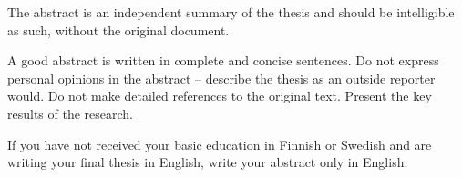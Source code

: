 The abstract is an independent summary of the thesis and should be intelligible as such, without the original document.

A good abstract is written in complete and concise sentences. Do not express personal opinions in the abstract – describe the thesis as an outside reporter would. Do not make detailed references to the original text. Present the key results of the research.

If you have not received your basic education in Finnish or Swedish and are writing your final thesis in English, write your abstract only in English.